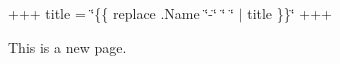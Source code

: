 +++ title = \char`\"{}\{\{ replace .\+Name \char`\"{}-\/\char`\"{} \char`\"{} \char`\"{} $\vert$ title \}\}\char`\"{} +++

This is a new page. 